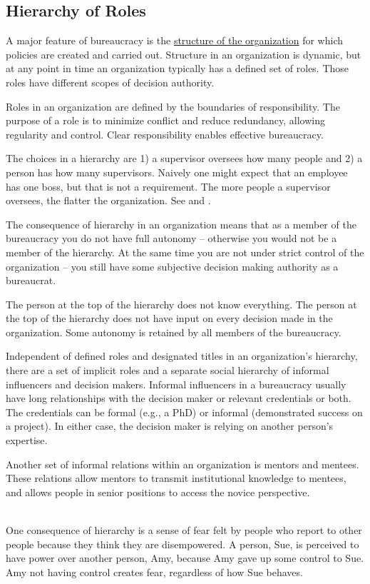 \subsection{Hierarchy of Roles}
A major feature of bureaucracy is the \href{https://en.wikipedia.org/wiki/Organizational_structure}{structure of the organization} for which policies are created and carried out. Structure in an organization is dynamic, but at any point in time an organization typically has a defined set of roles. Those roles have different scopes of decision authority. 

Roles in an organization are defined by the boundaries of responsibility. The purpose of a role is to minimize conflict and reduce redundancy, allowing regularity and control. Clear responsibility enables effective bureaucracy. 

The choices in a hierarchy are 1) a supervisor oversees how many people and 2) a person has how many supervisors. Naively one might expect that an employee has one boss, but that is not a requirement. 
The more people a supervisor oversees, the flatter the organization. See \cite{2012_Valve} and \cite{1972_Joreen}.

The consequence of hierarchy in an organization means that as a member of the bureaucracy you do not have full autonomy -- otherwise you would not be a member of the hierarchy. At the same time you are not under strict control of the organization -- you still have some subjective decision making authority as a bureaucrat.

The person at the top of the hierarchy does not know everything. The person at the top of the hierarchy does not have input on every decision made in the organization. Some autonomy is retained by all members of the bureaucracy.

Independent of defined roles and designated titles in an organization's hierarchy, there are a set of implicit roles and a separate social hierarchy of informal influencers and decision makers. Informal influencers in a bureaucracy usually have long relationships with the decision maker or relevant credentials or both. The credentials can be formal (e.g., a PhD) or informal (demonstrated success on a project). In either case, the decision maker is relying on another person's expertise. 

Another set of informal relations within an organization is mentors and mentees. These relations allow mentors to transmit institutional knowledge to mentees, and allows people in senior positions to access the novice perspective. 


\ \\
One consequence of hierarchy is a sense of fear felt by people who report to other people because they think they are disempowered. A person, Sue, is perceived to have power over another person, Amy, because Amy gave up some control to Sue. Amy not having control creates fear, regardless of how Sue behaves.   


